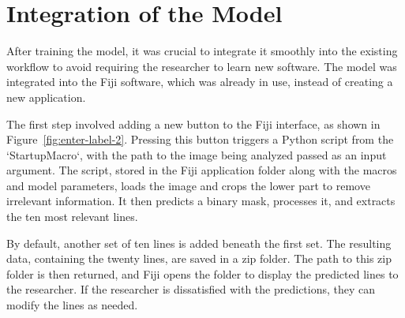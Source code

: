 \section{Integration of the Model}

After training the model, it was crucial to integrate it smoothly into the existing workflow to avoid requiring the researcher to learn new software. The model was integrated into the Fiji software, which was already in use, instead of creating a new application.

The first step involved adding a new button to the Fiji interface, as shown in Figure~\ref{fig:enter-label-2}. Pressing this button triggers a Python script from the `StartupMacro`, with the path to the image being analyzed passed as an input argument. The script, stored in the Fiji application folder along with the macros and model parameters, loads the image and crops the lower part to remove irrelevant information. It then predicts a binary mask, processes it, and extracts the ten most relevant lines.

By default, another set of ten lines is added beneath the first set. The resulting data, containing the twenty lines, are saved in a zip folder. The path to this zip folder is then returned, and Fiji opens the folder to display the predicted lines to the researcher. If the researcher is dissatisfied with the predictions, they can modify the lines as needed.

